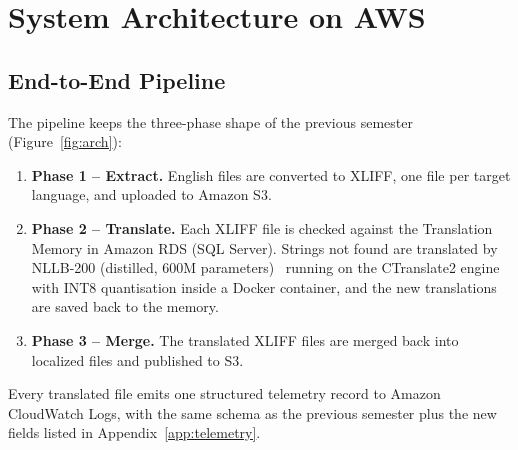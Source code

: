 \section{System Architecture on AWS}
\label{sec:arch}

\subsection{End-to-End Pipeline}
The pipeline keeps the three-phase shape of the previous semester (Figure~\ref{fig:arch}):

\begin{enumerate}
  \item \textbf{Phase 1 -- Extract.} English  files are converted to XLIFF, one file per target language,
        and uploaded to Amazon S3.
  \item \textbf{Phase 2 -- Translate.} Each XLIFF file is checked against the Translation Memory in Amazon RDS (SQL
        Server). Strings not found are translated by NLLB-200 (distilled, 600M parameters)~\cite{nllb} running on the
        CTranslate2 engine~\cite{ct2} with INT8 quantisation inside a Docker container, and the new translations are saved
        back to the memory.
  \item \textbf{Phase 3 -- Merge.} The translated XLIFF files are merged back into localized  files and
        published to S3.
\end{enumerate}

Every translated file emits one structured  telemetry record to Amazon CloudWatch Logs, with the
same schema as the previous semester plus the new fields listed in Appendix~\ref{app:telemetry}.

